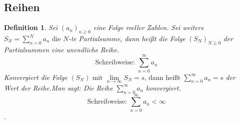 \documentclass[a4paper,titlepage,oneside]{article}
\newcommand{\suminf}[2][n]{\ensuremath{\sum_{#1= 0}^{\infty}{#2}}}
\renewcommand{\liminf}[2][n]{\ensuremath{\lim\limits_{#1 \rightarrow \infty}{#2}}}
\theoremstyle{thmstyle}
\newtheorem{defi}[satz]{Definition}
\begin{document}
\subsection{Reihen}

\begin{defi}
Sei \((a_n)_{n \ge 0}\) eine Folge reeller Zahlen. Sei weiters \(S_N = \sum_{n = 0}^{N}{a_n} \text{ die }N\)-te Partialsumme, dann heißt die Folge \((S_N)_{N \ge 0}\) der Partialsummen eine unendliche Reihe.\\
\[\text{Schreibweise: }\suminf{a_n}\]
Konvergiert die Folge \((S_N)\text{ mit }\liminf{S_N} = s \text{, dann heißt } \suminf{a_n} = s\) der Wert der Reihe.Man sagt: Die Reihe \(\suminf{a_n}\) konvergiert.
\[\text{Schreibweise: } \suminf{a_n} < \infty\].
\end{defi}
\end{document}
